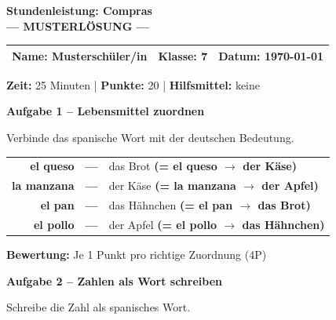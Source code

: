 \documentclass[11pt, a4paper]{article}
\newcommand{\fachfarbe}{spanisch}
\newcommand{\thema}{Stundenleistung: Compras}
\newcommand{\klasse}{7}
\newcommand{\maxpunkte}{20}
\newcommand{\zeit}{25 Minuten}
\newcommand{\datum}{\today}
\newcommand{\punktebox}[1]{\hfill\fbox{\small \_/#1}}
\newcommand{\lsg}[1]{\textcolor{loesung}{\textbf{#1}}}
\newenvironment{aufgabe}[1]{%
    \needspace{5\baselineskip}%
    \nopagebreak[4]%
    \vspace{10pt}
    \noindent\textbf{\textcolor{\fachfarbe}{Aufgabe #1}}
    \nopagebreak[4]%
    \vspace{5pt}
    \nopagebreak[4]%
    \begin{list}{}{\leftmargin=0pt}
    \item[]
}{%
    \end{list}
}
\newcommand{\es}[1]{\textcolor{\fachfarbe}{\textbf{#1}}}
\begin{document}
\begin{center}
    {\Large\bfseries\textcolor{\fachfarbe}{\thema}}\\[0.3em]
    {\large\textcolor{loesung}{\textbf{--- MUSTERLÖSUNG ---}}}
\end{center}

\vspace{5pt}

\noindent
\begin{tabularx}{\textwidth}{|X|X|X|}
\hline
\textbf{Name:} \lsg{Musterschüler/in} &
\textbf{Klasse:} \klasse &
\textbf{Datum:} \datum \\
\hline
\end{tabularx}

\vspace{10pt}

\begin{infobox}
\textbf{Zeit:} \zeit{} | \textbf{Punkte:} \maxpunkte{} | \textbf{Hilfsmittel:} keine
\end{infobox}

\vspace{15pt}

\begin{aufgabe}{1 -- Lebensmittel zuordnen}
Verbinde das spanische Wort mit der deutschen Bedeutung. \punktebox{4}
\end{aufgabe}

\begin{center}
\begin{tabular}{rcl}
\es{el queso} & \lsg{---} & das Brot \lsg{(= el queso $\rightarrow$ der Käse)} \\[0.8em]
\es{la manzana} & \lsg{---} & der Käse \lsg{(= la manzana $\rightarrow$ der Apfel)} \\[0.8em]
\es{el pan} & \lsg{---} & das Hähnchen \lsg{(= el pan $\rightarrow$ das Brot)} \\[0.8em]
\es{el pollo} & \lsg{---} & der Apfel \lsg{(= el pollo $\rightarrow$ das Hähnchen)} \\
\end{tabular}
\end{center}

\textbf{Bewertung:} Je 1 Punkt pro richtige Zuordnung (4P)

\vspace{15pt}

\begin{aufgabe}{2 -- Zahlen als Wort schreiben}
Schreibe die Zahl als spanisches Wort. \punktebox{4}
\end{aufgabe}
\end{document}
